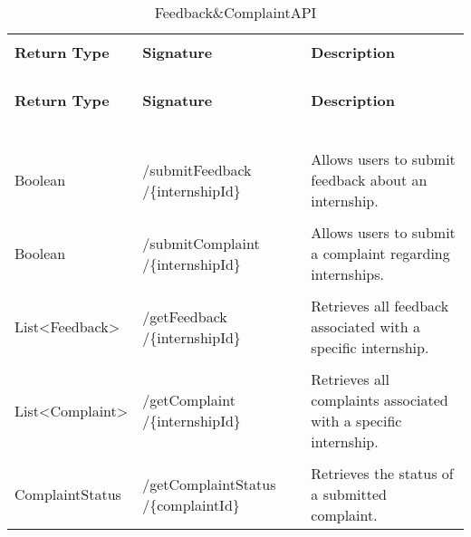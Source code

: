 \begin{longtable}{p{}p{}p{}}
    \caption{Feedback\&ComplaintAPI}
    \vspace{0.5em}\\
    \hline
    \vspace{0.5em}\\
    \textbf{Return Type} & \textbf{Signature} & \textbf{Description} \\
    \vspace{0.5em}\\
    \hline
    \vspace{0.5em}\\
    \endfirsthead
    \vspace{0.5em}\\
    \hline
    \vspace{0.5em}\\
    \textbf{Return Type} & \textbf{Signature} & \textbf{Description} \\
    \vspace{0.5em}\\
    \hline
    \vspace{0.5em}\\
    \endhead
    
    \vspace{0.5em}\\
    \hline
    \vspace{0.5em}\\
    \endfoot
    
    \vspace{0.5em}\\
    \hline
    \vspace{0.5em}\\
    \endlastfoot
    
    Boolean &
    /submitFeedback /\{internshipId\} &
    Allows users to submit feedback about an internship. \\
    \vspace{0.5em}\\
    Boolean &
    /submitComplaint /\{internshipId\} &
    Allows users to submit a complaint regarding internships. \\
    \vspace{0.5em}\\
    List<Feedback> &
    /getFeedback /\{internshipId\} &
    Retrieves all feedback associated with a specific internship. \\
    \vspace{0.5em}\\
    List<Complaint> &
    /getComplaint /\{internshipId\} &
    Retrieves all complaints associated with a specific internship. \\
    \vspace{0.5em}\\
    ComplaintStatus &
    /getComplaintStatus /\{complaintId\} &
    Retrieves the status of a submitted complaint. \\

\end{longtable}

